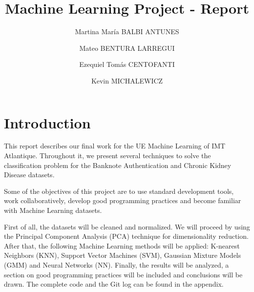 \documentclass[11pt,a4paper]{article}
\begin{document}

\title{Machine Learning Project - Report}

\author{
	Martina María BALBI ANTUNES\and
	Mateo BENTURA LARREGUI\and
	Ezequiel Tomás CENTOFANTI\and
	Kevin MICHALEWICZ
}




\IMTAfrontcover
\pagestyle{IMTAfancy} %

\IMTAsommaire
\newpage
\IMTAlistefigures  %
\IMTAlistetableaux   %
\newpage

\section{Introduction} 

This report describes our final work for the UE Machine Learning of IMT Atlantique. Throughout it, we present several techniques to solve the classification problem for the Banknote Authentication and Chronic Kidney Disease datasets.

Some of the objectives of this project are to use standard development tools, work collaboratively, develop good programming practices and become familiar with Machine Learning datasets.

First of all, the datasets will be cleaned and normalized. We will proceed by using the Principal Component Analysis (PCA) technique for dimensionality reduction. After that, the following Machine Learning methods will be applied: K-nearest Neighbors (KNN), Support Vector Machines (SVM), Gaussian Mixture Models (GMM) and Neural Networks (NN). Finally, the results will be analyzed, a section on good programming practices will be included and conclusions will be drawn. The complete code and the Git log can be found in the appendix.
\end{document}
